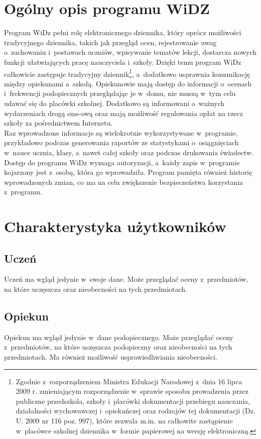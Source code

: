 \documentclass[12pt,leqno,twoside]{mwart}
\begin{document}
\section{Ogólny opis programu WiDZ}
\noindent Program WiDz pełni rolę elektronicznego dziennika, który oprócz możliwości tradycyjnego dziennika, takich jak przegląd ocen, rejestrowanie uwag o~zachowaniu i~postawach uczniów, wpisywanie tematów lekcji, dostarcza nowych funkcji ułatwiających pracę nauczyciela i~szkoły. Dzięki temu program WiDz całkowicie zastępuje tradycyjny dziennik\footnote{Zgodnie z~rozporządzeniem Ministra Edukacji Narodowej z~dnia 16 lipca 2009 r. zmieniającym rozporządzenie w~sprawie sposobu prowadzenia przez publiczne przedszkola, szkoły i~placówki dokumentacji przebiegu nauczania, działalności wychowawczej i~opiekuńczej oraz rodzajów tej dokumentacji (Dz. U. 2009 nr 116 poz. 997), które zezwala m.in. na całkowite zastąpienie w~placówce szkolnej dziennika w~formie papierowej na wersję elektroniczną.}, a~dodatkowo usprawnia komunikację między opiekunami a~szkołą. Opiekunowie mają dostęp do informacji o~ocenach i~frekwencji podopiecznych przeglądając je w~domu, nie muszą w~tym celu udawać się do placówki szkolnej. Dodatkowo są informowani o~ważnych wydarzeniach drogą sms-ową oraz mają możliwość regulowania opłat na rzecz szkoły za pośrednictwem Internetu.\\
\indent Raz wprowadzone informacje są wielokrotnie wykorzystywane w~programie, przykładowo podczas generowania raportów ze statystykami o~osiągnięciach w~nauce ucznia, klasy, a~nawet całej szkoły oraz podczas drukowania świadectw.\\
\indent Dostęp do programu WiDz wymaga autoryzacji, a~każdy zapis w~programie  kojarzony jest z~osobą, która go wprowadziła. Program pamięta również historię wprowadzonych zmian, co ma na celu zwiększenie bezpieczeństwa korzystania z~programu.

\section{Charakterystyka użytkowników}\label{CHARAKTER_UZYTK}
\subsection{Uczeń}
\noindent Uczeń ma wgląd jedynie w~swoje dane. Może przeglądać oceny z~przedmiotów, na które uczęszcza oraz nieobecności na tych przedmiotach.

\subsection{Opiekun}
\noindent Opiekun ma wgląd jedynie w~dane podopiecznego. Może przeglądać oceny z~przedmiotów, na które uczęszcza podopieczny oraz nieobecności na tych przedmiotach. Ma również możliwość usprawiedliwiania nieobecności.
\end{document}

